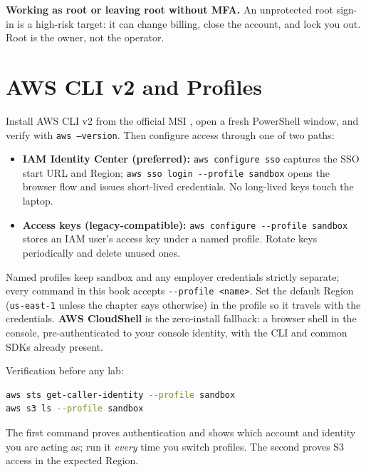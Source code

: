 \begin{pitfall}
\textbf{Working as root or leaving root without MFA.} An unprotected root sign-in is a high-risk
target: it can change billing, close the account, and lock you out. Root is the owner, not the
operator.
\end{pitfall}

\section{AWS CLI v2 and Profiles}
%
Install AWS CLI v2 from the official MSI \cite{awsCliV2UserGuide}, open a fresh PowerShell window,
and verify with \texttt{aws --version}. Then configure access through one of two paths:

\begin{itemize}
    \item \textbf{IAM Identity Center (preferred):} \texttt{aws configure sso} captures the SSO
    start URL and Region; \texttt{aws sso login -{}-profile sandbox} opens the browser flow and
    issues short-lived credentials. No long-lived keys touch the laptop.
    \item \textbf{Access keys (legacy-compatible):} \texttt{aws configure -{}-profile sandbox}
    stores an IAM user's access key under a named profile. Rotate keys periodically and delete
    unused ones.
\end{itemize}

Named profiles keep sandbox and any employer credentials strictly separate; every command in this
book accepts \texttt{-{}-profile <name>}. Set the default Region (\texttt{us-east-1} unless the
chapter says otherwise) in the profile so it travels with the credentials. \textbf{AWS CloudShell}
is the zero-install fallback: a browser shell in the console, pre-authenticated to your console
identity, with the CLI and common SDKs already present.

Verification before any lab:

\begin{lstlisting}[language=bash,caption={Environment smoke test used throughout the book.},label={lst:app-setup-smoke}]
aws sts get-caller-identity --profile sandbox
aws s3 ls --profile sandbox
\end{lstlisting}

The first command proves authentication and shows which account and identity you are acting as;
run it \emph{every} time you switch profiles. The second proves S3 access in the expected Region.


